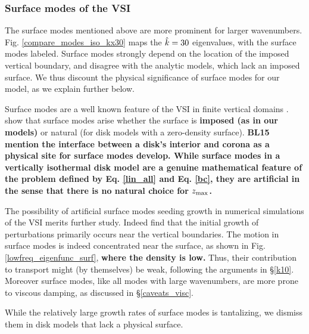 \subsubsection{Surface modes of the VSI}\label{surf_comment} 
The surface modes mentioned above are more prominent for larger
wavenumbers. Fig. \ref{compare_modes_iso_kx30} maps the $\hat{k} = 30$
eigenvalues, with the surface modes labeled.  Surface modes
strongly depend on the location of the imposed vertical boundary, and
disagree with the analytic models, which lack an imposed surface. We
thus discount the physical significance of surface modes for our
model, as we explain further below.  

Surface modes are a well known feature of the VSI in finite vertical
domains .  show
that surface modes arise whether the surface is {\bf imposed (as in
  our models)} or natural (for disk models with a zero-density surface).
{\bf BL15 mention the interface between a disk's interior and corona
  as a physical site for surface modes develop. While surface modes in
  a vertically isothermal disk model are a genuine mathematical feature of the 
  problem defined by Eq. \ref{lin_all} and Eq. \ref{bc}, they are
  artificial in the sense that there is no natural choice for $z_\mathrm{max}$.
}


The possibility of artificial surface modes seeding growth in
numerical simulations of the VSI  merits further study. Indeed
 find that the initial growth of perturbations
primarily occurs near the vertical boundaries. 
The motion in surface modes is indeed concentrated near the surface,
as shown in Fig. \ref{lowfreq_eigenfunc_surf}, {\bf where the density
  is low.} 
Thus, their contribution to
transport might (by themselves) be weak,  following the arguments in 
\S\ref{k10}.  Moreover surface modes, like all modes with large
wavenumbers, are more prone to viscous damping, as discussed in
\S\ref{caveats_visc}. 

While the relatively large growth rates of surface modes is
tantalizing, we dismiss them in disk models that lack a physical
surface.  

